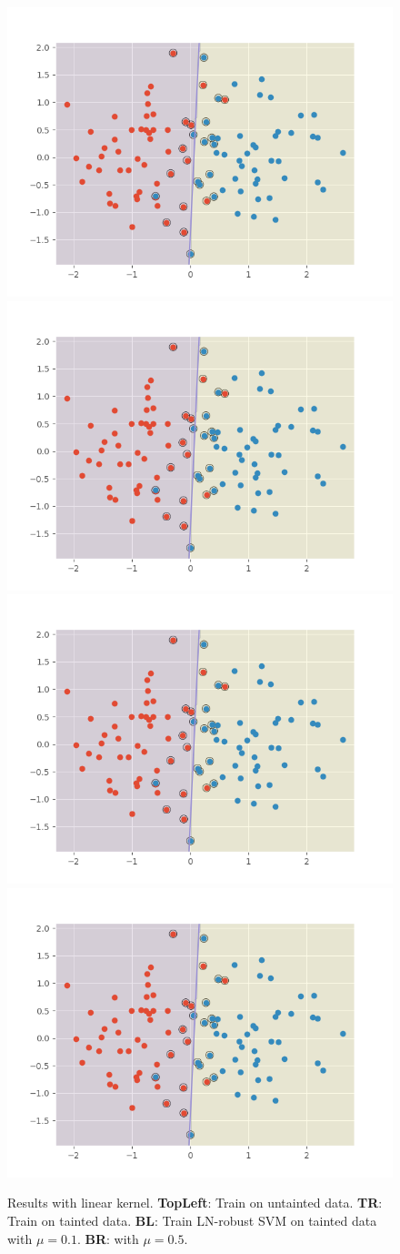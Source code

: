 \documentclass[12pt]{article}
\begin{document}
\begin{itemize}
    \begin{figure}
        \centering 
        \includegraphics[width=.45\textwidth]{./fig/linear/ori.png} 
        \includegraphics[width=.45\textwidth]{./fig/linear/ori.png} \\
        \includegraphics[width=.45\textwidth]{./fig/linear/ori.png} 
        \includegraphics[width=.45\textwidth]{./fig/linear/ori.png} 
        \caption{ Results with linear kernel. \textbf{TopLeft}: Train on untainted data. \textbf{TR}: Train on tainted data.
        \textbf{BL}: Train LN-robust SVM on tainted data with $\mu  = 0.1$. \textbf{BR}: with $\mu = 0.5$.}
        \label{fig:linear}
    \end{figure}


\end{itemize}
\end{document}
